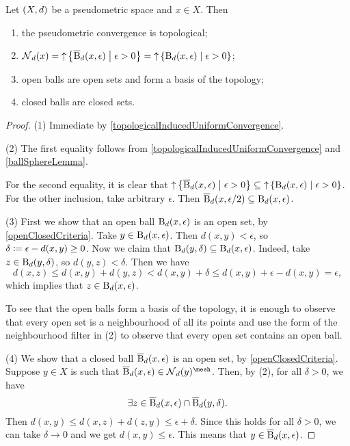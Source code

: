 \begin{lemma} \label{metricConvergenceNeighbourhood}
Let $\sSet{X,d}$ be a pseudometric space and $x\in X$. Then
\begin{enumerate}
\item the pseudometric convergence is topological;
\item $\neighbourhood_d(x) = \upset\setbuilder{\cball_d(x,\epsilon)}{\epsilon >0} = \upset\setbuilder{\ball_d(x,\epsilon)}{\epsilon >0}$;
\item open balls are open sets and form a basis of the topology;
\item closed balls are closed sets.
\end{enumerate}
\end{lemma}
\begin{proof}
(1) Immediate by \ref{topologicalInducedUniformConvergence}.

(2) The first equality follows from \ref{topologicalInducedUniformConvergence} and \ref{ballSphereLemma}.

For the second equality, it is clear that $\upset\setbuilder{\cball_d(x,\epsilon)}{\epsilon >0} \subseteq \upset\setbuilder{\ball_d(x,\epsilon)}{\epsilon >0}$. For the other inclusion, take arbitrary $\epsilon$. Then $\operatorname{\overline{B}}_d(x,\epsilon/2)\subseteq \operatorname{B}_d(x,\epsilon)$.

(3) First we show that an open ball $\operatorname{B}_d(x,\epsilon)$ is an open set, by \ref{openClosedCriteria}. Take $y\in \operatorname{B}_d(x,\epsilon)$. Then $d(x,y)<\epsilon$, so $\delta \coloneqq \epsilon - d(x,y) \geq 0$. Now we claim that $\operatorname{B}_d(y,\delta)\subseteq \operatorname{B}_d(x,\epsilon)$. Indeed, take $z\in \operatorname{B}_d(y,\delta)$, so $d(y,z)<\delta$. Then we have
\[ d(x,z) \leq d(x,y) + d(y,z) < d(x,y) + \delta \leq d(x,y) + \epsilon - d(x,y) = \epsilon, \]
which implies that $z\in \operatorname{B}_d(x,\epsilon)$.

To see that the open balls form a basis of the topology, it is enough to observe that every open set is a neighbourhood of all its points and use the form of the neighbourhood filter in (2) to observe that every open set contains an open ball.

(4) We show that a closed ball $\operatorname{\overline{B}}_d(x,\epsilon)$ is an open set, by \ref{openClosedCriteria}. Suppose $y\in X$ is such that $\cball_d(x,\epsilon) \in \neighbourhood_d(y)^\mesh$. Then, by (2), for all $\delta >0$, we have
\[ \exists z \in \operatorname{\overline{B}}_d(x,\epsilon) \cap \operatorname{\overline{B}}_d(y,\delta). \]
Then $d(x,y) \leq d(x,z) + d(z,y) \leq \epsilon + \delta$. Since this holds for all $\delta > 0$, we can take $\delta \to 0$ and we get $d(x,y) \leq \epsilon$. This means that $y\in \operatorname{\overline{B}}_d(x,\epsilon)$.
\end{proof}
